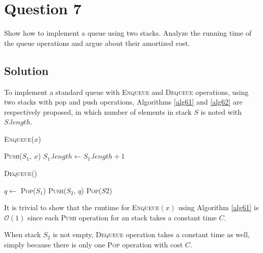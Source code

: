 
\section*{Question 7}

Show how to implement a queue using two stacks.
Analyze the running time of the queue operations and argue about their amortized cost.

\subsection*{Solution}

To implement a standard queue with \textsc{Enqueue} and \textsc{Dequeue} operations, using two stacks with pop and push operations, Algorithms \ref{alg61} and \ref{alg62} are respectively proposed, in which number of elements in stack $S$ is noted with $S.length$.

\begin{algorithm}[H]
\caption{\textsc{Enqueue($x$)}}\label{alg61}
\begin{algorithmic}[1]
\State \textsc{Push($S_1$, $x$)}
\State $S_1.length \leftarrow S_1.length + 1$
\end{algorithmic}
\end{algorithm}

\begin{algorithm}[H]
\caption{\textsc{Dequeue()}}\label{alg62}
\begin{algorithmic}[1]
\State $q \leftarrow$ \textsc{Pop}($S_1$)
\State \textsc{Push}($S_2$, $q$)
\EndFor
\EndIf
\State \Return \textsc{Pop}($S2$)
\end{algorithmic}
\end{algorithm}

It is trivial to show that the runtime for \textsc{Enqueue}$(x)$ using Algorithm \ref{alg61} is $\mathcal{O}(1)$ since each \textsc{Push} operation for an stack takes a constant time $C$.

When stack $S_2$ is not empty, \textsc{Dequeue} operation takes a constant time as well, simply because there is only one \textsc{Pop} operation with cost $C$.

